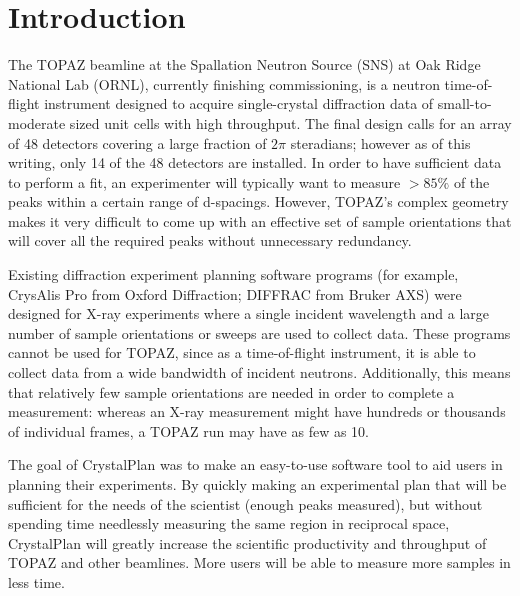 \documentclass[final]{iucr}              %
\begin{document}
\section{Introduction}

The TOPAZ beamline at the Spallation Neutron Source (SNS) at Oak Ridge National
Lab (ORNL), currently finishing commissioning, is a neutron time-of-flight
instrument designed to acquire single-crystal diffraction data of
small-to-moderate sized unit cells with high throughput. The final design calls
for an array of 48 detectors covering a large fraction of  $2\pi$ steradians;
however as of this writing, only 14 of the 48 detectors are installed. In order
to have sufficient data to perform a fit, an experimenter will  typically want
to measure $ > 85\%$ of the peaks within a certain range of d-spacings. 
However, TOPAZ's complex geometry makes it very difficult to come up with an
effective set of sample orientations that will cover all the required peaks
without unnecessary redundancy. 


Existing diffraction experiment planning software programs (for example,
CrysAlis Pro from Oxford Diffraction; DIFFRAC from Bruker AXS) were designed for
X-ray experiments where a single  incident wavelength and a large number of
sample orientations or sweeps are used to collect data. 
These programs cannot be used for TOPAZ, since as a time-of-flight instrument, 
it is able to collect data from a wide bandwidth of incident neutrons. 
Additionally, this means that relatively few sample orientations are needed in
order to complete a measurement: whereas an X-ray measurement might have
hundreds or thousands of individual frames, a TOPAZ run may have as few as 10.   


The goal of CrystalPlan was to make an easy-to-use software tool to aid users in
planning their experiments. By quickly making an experimental plan that will be
sufficient for the needs of the scientist (enough peaks measured), but without
spending time needlessly measuring the same region in reciprocal space,
CrystalPlan will greatly increase the scientific productivity and throughput of
TOPAZ and other beamlines. More users will be able to measure more samples in
less time.

\end{document}
